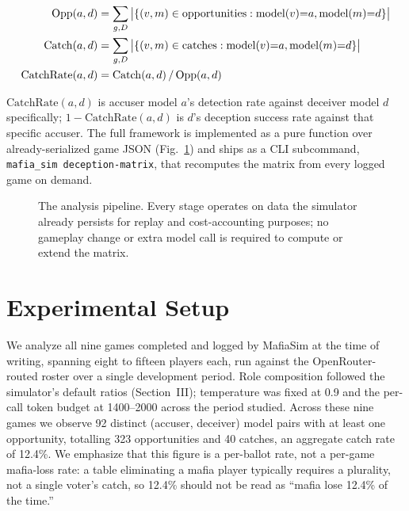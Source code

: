 \documentclass[10pt,conference]{IEEEtran}
\begin{document}
\begin{align}
\mathrm{Opp}(a,d) &= \sum_{g,D} \big|\{(v,m) \in \mathrm{opportunities} : \mathrm{model}(v){=}a, \mathrm{model}(m){=}d\}\big| \notag\\
\mathrm{Catch}(a,d) &= \sum_{g,D} \big|\{(v,m) \in \mathrm{catches} : \mathrm{model}(v){=}a, \mathrm{model}(m){=}d\}\big| \notag\\
\mathrm{CatchRate}(a,d) &= \mathrm{Catch}(a,d) \,/\, \mathrm{Opp}(a,d) \notag
\end{align}

$\mathrm{CatchRate}(a,d)$ is accuser model $a$'s detection rate against deceiver model $d$ specifically; $1-\mathrm{CatchRate}(a,d)$ is $d$'s deception success rate against that specific accuser. The full framework is implemented as a pure function over already-serialized game JSON (Fig.~\ref{fig:pipeline}) and ships as a CLI subcommand, \texttt{mafia\_sim deception-matrix}, that recomputes the matrix from every logged game on demand.

\begin{figure}[t]
\centering
{}
\caption{The analysis pipeline. Every stage operates on data the simulator already persists for replay and cost-accounting purposes; no gameplay change or extra model call is required to compute or extend the matrix.}
\label{fig:pipeline}
\end{figure}

\section{Experimental Setup}

We analyze all nine games completed and logged by MafiaSim at the time of writing, spanning eight to fifteen players each, run against the OpenRouter-routed roster over a single development period. Role composition followed the simulator's default ratios (Section~III); temperature was fixed at 0.9 and the per-call token budget at 1400--2000 across the period studied. Across these nine games we observe 92 distinct (accuser, deceiver) model pairs with at least one opportunity, totalling 323 opportunities and 40 catches, an aggregate catch rate of 12.4\%. We emphasize that this figure is a per-ballot rate, not a per-game mafia-loss rate: a table eliminating a mafia player typically requires a plurality, not a single voter's catch, so 12.4\% should not be read as ``mafia lose 12.4\% of the time.''
\end{document}
